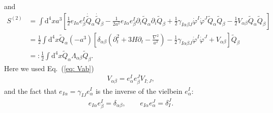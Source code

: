 \documentclass[aps, prd
, preprint
, nofootinbib 
]{revtex4-1}
\newcommand{\dd}{\mathrm{d}}
\newcommand{\bae}[1]{\begin{align} #1 \end{align}}
\begin{document}
and
\bae{
	S^{(2)}&=\int\dd^4xa^3\left[\frac{1}{2}e_{I\alpha}e^I_\beta\dot{\tilde{Q}}_\alpha\dot{\tilde{Q}}_\beta
	-\frac{1}{2a^2}e_{I\alpha}e^I_\beta\partial_i\tilde{Q}_\alpha\partial_i\tilde{Q}_\beta
	+\frac{1}{2}\gamma_{I\alpha\beta J}\dot{\varphi}^I\dot{\varphi}^J\tilde{Q}_\alpha\tilde{Q}_\beta
	-\frac{1}{2}V_{\alpha\beta}\tilde{Q}_\alpha\tilde{Q}_\beta\right] \nonumber \\
	&=\frac{1}{2}\int\dd^4x\tilde{Q}_\alpha(-a^3)\left[\delta_{\alpha\beta}\left(\partial_t^2+3H\partial_t-\frac{\nabla^2}{a^2}\right)
	-\frac{1}{2}\gamma_{I\alpha\beta J}\dot{\varphi}^I\dot{\varphi}^J+V_{\alpha\beta}\right]\tilde{Q}_\beta \nonumber \\
	&=:\frac{1}{2}\int\dd^4x\tilde{Q}_\alpha\Lambda_{\alpha\beta}\tilde{Q}_\beta.
}
Here we used Eq.~(\ref{eq: Vab})
\bae{
	V_{\alpha\beta}=e^I_\alpha e^J_\beta V_{I;J},
}
and the fact that $e_{I\alpha}=\gamma_{IJ}e^I_\alpha$ is the inverse of the vielbein $e^I_\alpha$:
\bae{
	e_{I\alpha}e^I_\beta=\delta_{\alpha\beta}, \quad\quad e_{I\alpha}e^J_\alpha=\delta^J_I.
}
\end{document}
